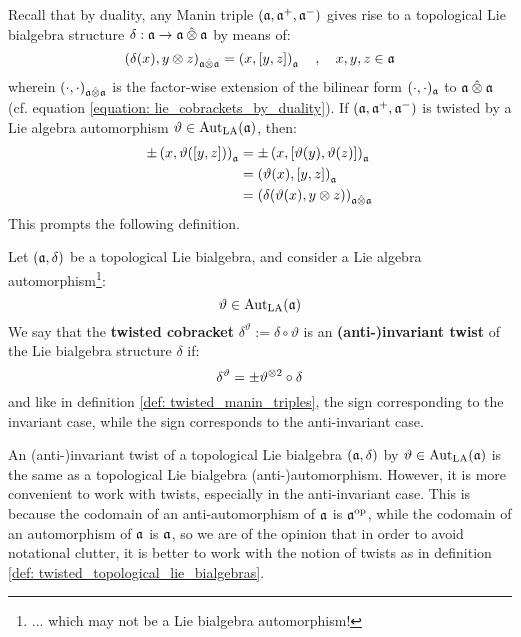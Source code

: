         Recall that by duality, any Manin triple $(\mathfrak{a}, \mathfrak{a}^+, \mathfrak{a}^-)$ gives rise to a topological Lie bialgebra structure $\delta: \a \to \a \hattensor \a$ by means of:
            $$\left( \delta(x), y \tensor z \right)_{\a \hattensor \a} = \left( x, [y, z] \right)_{\a} \quad, \quad x, y, z \in \a$$
        wherein $(\cdot, \cdot)_{\a \hattensor \a}$ is the factor-wise extension of the bilinear form $(\cdot, \cdot)_{\mathfrak{a}}$ to $\a \hattensor \a$ (cf. equation \eqref{equation: lie_cobrackets_by_duality}). If $(\mathfrak{a}, \mathfrak{a}^+, \mathfrak{a}^-)$ is twisted by a Lie algebra automorphism $\vartheta \in \operatorname{Aut}_{\mathrm{LA}}(\mathfrak{a})$, then:
            \begin{equation} \label{equation: twisted_lie_cobrackets_by_duality}
                \begin{aligned}
                    \pm \left( x, \vartheta([y, z]) \right)_{\a} & = \pm \left( x, [\vartheta(y), \vartheta(z)] \right)_{\a}
                    \\
                    & = \left( \vartheta(x), [y, z] \right)_{\a}
                    \\
                    & = \left( \delta( \vartheta(x), y \tensor z ) \right)_{\a \hattensor \a}
                \end{aligned}
            \end{equation}
        This prompts the following definition.
        \begin{definition} \label{def: twisted_topological_lie_bialgebras}
            Let $(\mathfrak{a}, \delta)$ be a topological Lie bialgebra, and consider a Lie algebra automorphism\footnote{... which may not be a Lie bialgebra automorphism!}:
                $$\vartheta \in \operatorname{Aut}_{\mathrm{LA}}(\mathfrak{a})$$
            We say that the \textbf{twisted cobracket} $\delta^{\vartheta} := \delta \circ \vartheta$ is an \textbf{(anti-)invariant twist} of the Lie bialgebra structure $\delta$ if:
                $$\delta^{\vartheta} = \pm \vartheta^{\tensor 2} \circ \delta$$
            and like in definition \ref{def: twisted_manin_triples}, the \say{$+$} sign corresponding to the invariant case, while the \say{$-$} sign corresponds to the anti-invariant case.
        \end{definition}
        \begin{remark}
            An (anti-)invariant twist of a topological Lie bialgebra $(\mathfrak{a}, \delta)$ by $\vartheta \in \operatorname{Aut}_{\mathrm{LA}}(\mathfrak{a})$ is the same as a topological Lie bialgebra (anti-)automorphism. However, it is more convenient to work with twists, especially in the anti-invariant case. This is because the codomain of an anti-automorphism of $\mathfrak{a}$ is $\mathfrak{a}^{\mathrm{op}}$, while the codomain of an automorphism of $\mathfrak{a}$ is $\mathfrak{a}$, so we are of the opinion that in order to avoid notational clutter, it is better to work with the notion of twists as in definition \ref{def: twisted_topological_lie_bialgebras}.
        \end{remark}
